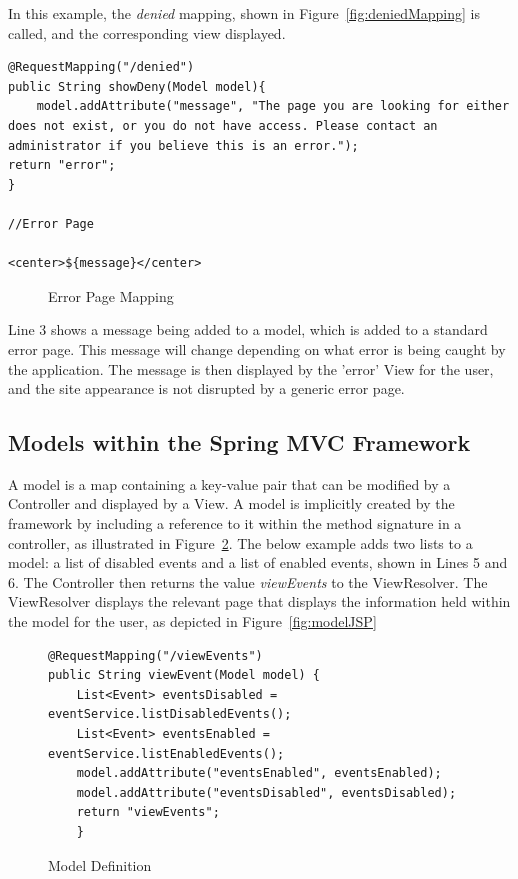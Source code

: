 In this example, the \textit{denied} mapping, shown in Figure~\ref{fig:deniedMapping} is called, and the corresponding view displayed. 

\begin{lstlisting}
@RequestMapping("/denied")
public String showDeny(Model model){
	model.addAttribute("message", "The page you are looking for either does not exist, or you do not have access. Please contact an administrator if you believe this is an error.");
return "error";
}

//Error Page

<center>${message}</center>
\end{lstlisting}
\begin{figure}[H]
\caption{Error Page Mapping}
\label{fig:accessDenied}
\end{figure}

Line 3 shows a message being added to a model, which is added to a standard error page. This message will change depending on what error is being caught by the application. The message is then displayed by the 'error' View for the user, and the site appearance is not disrupted by a generic error page.

\subsection{Models within the Spring MVC Framework}

A model is a map containing a key-value pair that can be modified by a Controller and displayed by a View. A model is implicitly created by the framework by including a reference to it within the method signature in a controller, as illustrated in Figure~\ref{fig:modelDefine}. The below example adds two lists to a model: a list of disabled events and a list of enabled events, shown in Lines 5 and 6. The Controller then returns the value \textit{viewEvents} to the ViewResolver. The ViewResolver displays the relevant page that displays the information held within the model for the user, as depicted in Figure~\ref{fig:modelJSP}

\begin{figure}[H]
\begin{lstlisting}
@RequestMapping("/viewEvents")
public String viewEvent(Model model) {
	List<Event> eventsDisabled = eventService.listDisabledEvents();
	List<Event> eventsEnabled = eventService.listEnabledEvents();
	model.addAttribute("eventsEnabled", eventsEnabled);
	model.addAttribute("eventsDisabled", eventsDisabled);
    return "viewEvents";
	}
\end{lstlisting}
\caption{Model Definition}
\label{fig:modelDefine}
\end{figure}

